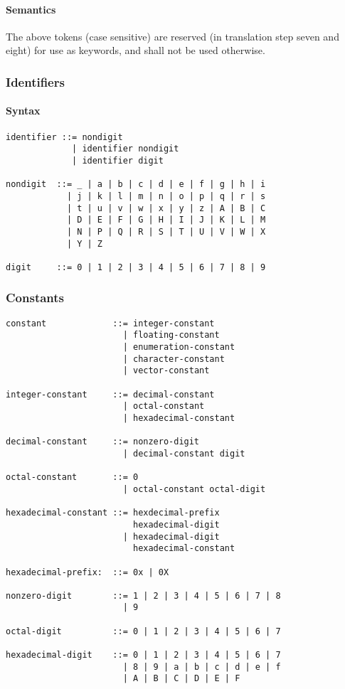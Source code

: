 \documentclass{article}
\begin{document}
\paragraph*{Semantics}
The above tokens (case sensitive) are reserved (in translation step seven and eight) for 
use as keywords, and shall not be used otherwise.

\subsubsection{Identifiers}
\paragraph*{Syntax}
\begin{lstlisting}[language=bnf]
identifier ::= nondigit
             | identifier nondigit
             | identifier digit
             
nondigit  ::= _ | a | b | c | d | e | f | g | h | i 
            | j | k | l | m | n | o | p | q | r | s
            | t | u | v | w | x | y | z | A | B | C
            | D | E | F | G | H | I | J | K | L | M
            | N | P | Q | R | S | T | U | V | W | X
            | Y | Z

digit     ::= 0 | 1 | 2 | 3 | 4 | 5 | 6 | 7 | 8 | 9
\end{lstlisting}

\subsubsection{Constants}
\begin{lstlisting}[language=bnf]
constant             ::= integer-constant
                       | floating-constant
                       | enumeration-constant
                       | character-constant
                       | vector-constant
           
integer-constant     ::= decimal-constant
                       | octal-constant
                       | hexadecimal-constant
                   
decimal-constant     ::= nonzero-digit
                       | decimal-constant digit
                   
octal-constant       ::= 0
                       | octal-constant octal-digit
                   
hexadecimal-constant ::= hexdecimal-prefix
                         hexadecimal-digit
                       | hexadecimal-digit
                         hexadecimal-constant

hexadecimal-prefix:  ::= 0x | 0X

nonzero-digit        ::= 1 | 2 | 3 | 4 | 5 | 6 | 7 | 8
                       | 9
                       
octal-digit          ::= 0 | 1 | 2 | 3 | 4 | 5 | 6 | 7

hexadecimal-digit    ::= 0 | 1 | 2 | 3 | 4 | 5 | 6 | 7
                       | 8 | 9 | a | b | c | d | e | f
                       | A | B | C | D | E | F
\end{lstlisting}
\end{document}
